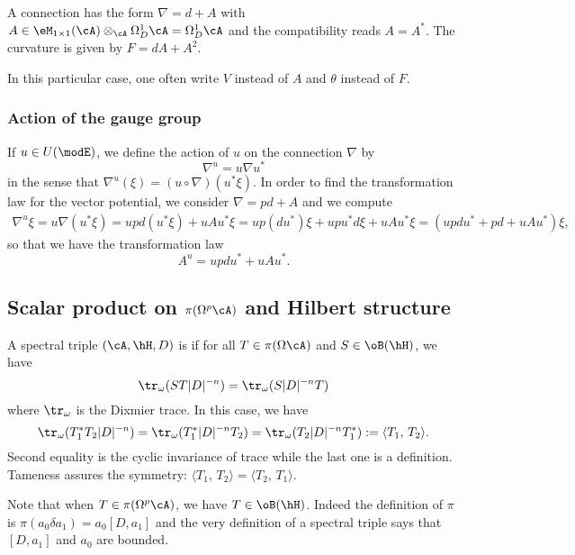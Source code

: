 A connection has the form $\nabla=d+A$ with $A\in\eM_{1\times 1}(\cA)\otimes_{\cA}\Omega^1_D\cA=\Omega^1_D\cA$ and the compatibility reads $A=A^*$. The curvature is given by $F=dA+A^2$.

In this particular case, one often write $V$ instead of $A$ and $\theta$ instead of $F$.

\subsubsection{Action of the gauge group}	\label{PgSimplestwordl}

If $u\in U(\modE)$, we define the action of $u$ on the connection $\nabla$ by
\begin{equation}
	\nabla^u=u\nabla u^*
\end{equation}
in the sense that $\nabla^u(\xi)=(u\circ\nabla)(u^*\xi)$. In order to find the transformation law for the vector potential, we consider $\nabla=pd+A$ and we compute
\[
	\begin{split}
		\nabla^u\xi	=u\nabla(u^*\xi)
		=upd(u^*\xi)+uAu^*\xi
		=up(du^*)\xi+upu^*d\xi+uAu^*\xi
		=(updu^*+pd+uAu^*)\xi,
	\end{split}
\]
so that we have the transformation law
\begin{equation}		\label{EqTransAjauge}
	A^u=updu^*+uAu^*.
\end{equation}

\subsection{Scalar product on \texorpdfstring{$\pi(\Omega^p\cA)$}{piOpA} and Hilbert structure}

A spectral triple $(\cA,\hH,D)$ is  if for all $T\in\pi(\Omega\cA)$ and $S\in\oB(\hH)$, we have
\[
	\tr_{\omega}(ST|D|^{-n})=\tr_{\omega}(S|D|^{-n} T)
\]
where $\tr_{\omega}$ is the Dixmier trace. In this case, we have
\begin{equation}
	\tr_{\omega}(T_1^*T_2|D|^{-n})=\tr_{\omega}(T_1^*|D|^{-n}T_2)=\tr_{\omega}(T_2|D|^{-n}T_1^*):=\langle T_1,\,T_2\rangle.
\end{equation}
Second equality is the cyclic invariance of trace while the last one is a definition. Tameness assures the symmetry: $\langle T_1,\,T_2\rangle=\langle T_2,\,T_1\rangle$.

Note that when $T\in\pi(\Omega^p\cA)$, we have $T\in\oB(\hH)$. Indeed the definition of $\pi$ is $\pi(a_0\delta a_1)=a_0[D,a_1]$ and the very definition of a spectral triple says that $[D,a_1]$ and $a_0$ are bounded.

